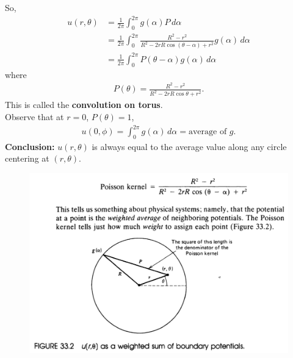 \documentclass{article}
\theoremstyle{definition}
\newcommand{\f}[2]{\frac{#1}{#2}}
\begin{document}
So,
\begin{align*}
u(r,\theta) &= \f{1}{2\pi}\int^{2\pi}_0 g(\alpha)P\,d\alpha \\
&= \f{1}{2\pi}\int^{2\pi}_0 \f{R^2-r^2}{R^2 - 2rR\cos(\theta-\alpha)+r^2}g(\alpha)\,d\alpha\\
&= \boxed{\f{1}{2\pi}\int^{2\pi}_0 P(\theta-\alpha) g(\alpha) \,d\alpha}
\end{align*}
where 
\begin{align*}
P(\theta) = \f{R^2-r^2}{R^2 - 2rR\cos\theta + r^2}.
\end{align*}
This is called the \textbf{convolution on torus}. \\

Observe that at $r=0$, $P(\theta) = 1$, 
\begin{align*}
u(0,\phi) = \int^{2\pi}_0 g(\alpha)\,d\alpha = \text{average of } g. 
\end{align*}
\textbf{Conclusion:} $u(r,\theta)$ is always equal to the average value along any circle centering at $(r,\theta)$.
\begin{figure}[h!]
	\centering
	\includegraphics[scale=0.75]{poisson.png}
\end{figure}
\end{document}
